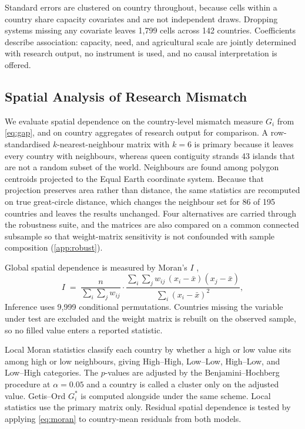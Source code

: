 \documentclass[ASNA,twocolumn]{USG}
\begin{document}
Standard errors are clustered on country throughout, because cells within a country share
capacity covariates and are not independent draws. Dropping systems missing any covariate leaves 1,799 cells across 142 countries. Coefficients describe association: capacity, need,
and agricultural scale are jointly determined with research output, no instrument is used, and
no causal interpretation is offered.

\subsection{Spatial Analysis of Research Mismatch}

We evaluate spatial dependence on the country-level mismatch measure $G_{i}$ from
\eqref{eq:gap}, and on country aggregates of research output for comparison. A
row-standardised $k$-nearest-neighbour matrix with $k=6$ is primary because it leaves every
country with neighbours, whereas queen contiguity strands 43 islands that are not a random
subset of the world. Neighbours are found among polygon centroids projected to the Equal Earth
coordinate system. Because that projection preserves area rather than distance, the same
statistics are recomputed on true great-circle distance, which changes the neighbour set for 86
of 195 countries and leaves the results unchanged. Four alternatives are carried through the robustness suite, and the matrices are also
compared on a common connected subsample so that weight-matrix sensitivity is not confounded
with sample composition (\ref{app:robust}).

Global spatial dependence is measured by Moran's $I$ \cite{Moran1950},
\begin{equation}
I \;=\; \frac{n}{\sum_{i}\sum_{j} w_{ij}} \cdot
\frac{\sum_{i}\sum_{j} w_{ij}\,(x_{i}-\bar{x})(x_{j}-\bar{x})}{\sum_{i}(x_{i}-\bar{x})^{2}},
\label{eq:moran}
\end{equation}
Inference uses 9,999 conditional permutations.
Countries missing the variable under test are excluded and the weight matrix is rebuilt on
the observed sample, so no filled value enters a reported statistic.

Local Moran statistics \cite{Anselin1995} classify each country by whether a high or low
value sits among high or low neighbours, giving High--High, Low--Low, High--Low, and
Low--High categories. The $p$-values are
adjusted by the Benjamini--Hochberg procedure \cite{BenjaminiHochberg1995} at $\alpha=0.05$
and a country is called a cluster only on the adjusted value. Getis--Ord $G^{*}_{i}$
\cite{GetisOrd1992} is computed alongside under the same scheme. Local statistics use the
primary matrix only. Residual spatial dependence is tested by applying \eqref{eq:moran} to
country-mean residuals from both models.
\end{document}
